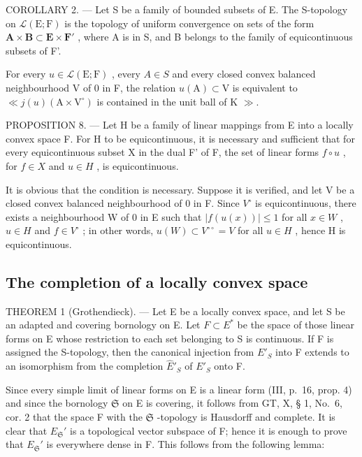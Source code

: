 COROLLARY 2. --- Let S be a family of bounded subsets of E. The S-topology on \(\mathcal{L}(\mathrm{E};\mathrm{F})\) is the topology of uniform convergence on sets of the form \(\mathbf{A}\times\mathbf{B}\subset\mathbf{E}\times\mathbf{F}'\) , where A is in S, and B belongs to the family of equicontinuous subsets of F'.

For every \(u \in \mathcal{L}(\mathrm{E}; \mathrm{F})\) , every \(A \in S\) and every closed convex balanced neighbourhood V of 0 in F, the relation \(u(\mathrm{A}) \subset \mathrm{V}\) is equivalent to \(\ll j(u) (\mathrm{A} \times \mathrm{V}^{\circ})\) is contained in the unit ball of K \(\gg\).

PROPOSITION 8. --- Let H be a family of linear mappings from E into a locally convex space F. For H to be equicontinuous, it is necessary and sufficient that for every equicontinuous subset X in the dual F' of F, the set of linear forms \(f \circ u\) , for \(f \in X\) and \(u \in H\) , is equicontinuous.

It is obvious that the condition is necessary. Suppose it is verified, and let V be a closed convex balanced neighbourhood of 0 in F. Since \(V^{\circ}\) is equicontinuous, there exists a neighbourhood W of 0 in E such that \(\left|f(u(x))\right| \leqslant 1\) for all \(x \in W\) , \(u \in H\) and \(f \in V^{\circ}\) ; in other words, \(u(W) \subset V^{\circ\circ} = V\) for all \(u \in H\) , hence H is equicontinuous.

\subsection{The completion of a locally convex space}

THEOREM 1 (Grothendieck). --- Let E be a locally convex space, and let S be an adapted and covering bornology on E. Let \(F \subset E^{*}\) be the space of those linear forms on E whose restriction to each set belonging to S is continuous. If F is assigned the S-topology, then the canonical injection from \(E'_{S}\) into F extends to an isomorphism from the completion \(\hat{E}'_{S}\) of \(E'_{S}\) onto F.

Since every simple limit of linear forms on E is a linear form (III, p.~16, prop. 4) and since the bornology \(\mathfrak{S}\) on E is covering, it follows from GT, X, § 1, No.~6, cor. 2 that the space F with the \(\mathfrak{S}\) -topology is Hausdorff and complete. It is clear that \(E_{\mathfrak{S}}'\) is a topological vector subspace of F; hence it is enough to prove that \(E_{\mathfrak{S}}'\) is everywhere dense in F. This follows from the following lemma:

